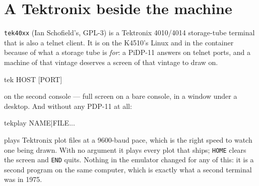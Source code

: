 \section{A Tektronix beside the machine}
\texttt{tek40xx} (Ian Schofield's, GPL-3) is a Tektronix 4010/4014
storage-tube terminal that is also a telnet client. It is on the K4510's
Linux and in the container because of what a storage tube is
\emph{for}: a PiDP-11 answers on telnet ports, and a machine of that
vintage deserves a screen of that vintage to draw on.

\begin{type}
tek HOST [PORT]
\end{type}

\noindent on the second console --- full screen on a bare console, in a
window under a desktop. And without any PDP-11 at all:

\begin{type}
tekplay NAME|FILE...
\end{type}

\noindent plays Tektronix plot files at a 9600-baud pace, which is the
right speed to watch one being drawn. With no argument it plays every
plot that ships; \texttt{HOME} clears the screen and \texttt{END} quits.
Nothing in the emulator changed for any of this: it is a second program
on the same computer, which is exactly what a second terminal was in
1975.

